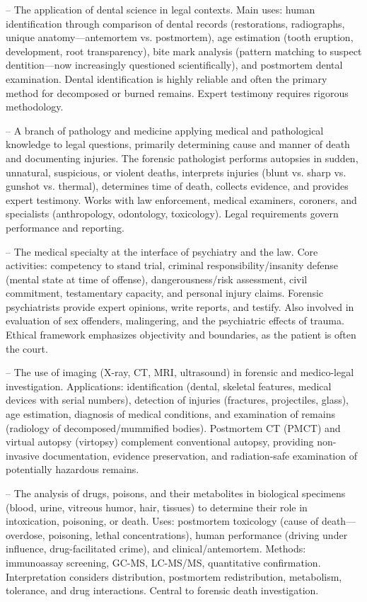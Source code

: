 -- The application of dental science in legal contexts. Main uses: human identification through comparison of dental records (restorations, radiographs, unique anatomy—antemortem vs. postmortem), age estimation (tooth eruption, development, root transparency), bite mark analysis (pattern matching to suspect dentition—now increasingly questioned scientifically), and postmortem dental examination. Dental identification is highly reliable and often the primary method for decomposed or burned remains. Expert testimony requires rigorous methodology.

-- A branch of pathology and medicine applying medical and pathological knowledge to legal questions, primarily determining cause and manner of death and documenting injuries. The forensic pathologist performs autopsies in sudden, unnatural, suspicious, or violent deaths, interprets injuries (blunt vs. sharp vs. gunshot vs. thermal), determines time of death, collects evidence, and provides expert testimony. Works with law enforcement, medical examiners, coroners, and specialists (anthropology, odontology, toxicology). Legal requirements govern performance and reporting.

-- The medical specialty at the interface of psychiatry and the law. Core activities: competency to stand trial, criminal responsibility/insanity defense (mental state at time of offense), dangerousness/risk assessment, civil commitment, testamentary capacity, and personal injury claims. Forensic psychiatrists provide expert opinions, write reports, and testify. Also involved in evaluation of sex offenders, malingering, and the psychiatric effects of trauma. Ethical framework emphasizes objectivity and boundaries, as the patient is often the court.

-- The use of imaging (X-ray, CT, MRI, ultrasound) in forensic and medico-legal investigation. Applications: identification (dental, skeletal features, medical devices with serial numbers), detection of injuries (fractures, projectiles, glass), age estimation, diagnosis of medical conditions, and examination of remains (radiology of decomposed/mummified bodies). Postmortem CT (PMCT) and virtual autopsy (virtopsy) complement conventional autopsy, providing non-invasive documentation, evidence preservation, and radiation-safe examination of potentially hazardous remains.

-- The analysis of drugs, poisons, and their metabolites in biological specimens (blood, urine, vitreous humor, hair, tissues) to determine their role in intoxication, poisoning, or death. Uses: postmortem toxicology (cause of death—overdose, poisoning, lethal concentrations), human performance (driving under influence, drug-facilitated crime), and clinical/antemortem. Methods: immunoassay screening, GC-MS, LC-MS/MS, quantitative confirmation. Interpretation considers distribution, postmortem redistribution, metabolism, tolerance, and drug interactions. Central to forensic death investigation.

